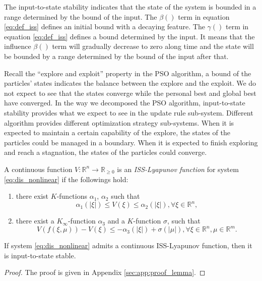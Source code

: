 The input-to-state stability indicates that the state of the system is bounded in a range determined by the bound of the input.
The $ \beta () $ term in equation \eqref{eq:def_iss} defines an initial bound with a decaying feature.
The $ \gamma () $ term in equation \eqref{eq:def_iss} defines a bound determined by the input.
It means that the influence $ \beta () $ term will gradually decrease to zero along time and the state will be bounded by a range determined by the bound of the input after that.

Recall the ``explore and exploit'' property in the PSO algorithm, a bound of the particles' states indicates the balance between the explore and the exploit.
We do not expect to see that the states converge while the personal best and global best have converged.
In the way we decomposed the PSO algorithm, input-to-state stability provides what we expect to see in the update rule sub-system.
Different algorithm provides different optimization strategy sub-systems. 
When it is expected to maintain a certain capability of the explore, the states of the particles could be managed in a boundary.
When it is expected to finish exploring and reach a stagnation, the states of the particles could converge.

\begin{mydef}\cite{Jiang2001857}
\label{eq:iss_func}
A continuous function $ V : \mathbb{R}^{n} \rightarrow \mathbb{R}_{\geq 0} $ is an \emph{ISS-Lyapunov function} for system \eqref{eq:dis_nonlinear} if the followings hold:
\begin{enumerate}
\item there exist $ K $-functions $ \alpha_{1} $, $ \alpha_{2} $ such that 
\begin{equation}
\label{eq:iss_lyapunov1}
\alpha_{1} ( | \xi | ) \leq V( \xi ) \leq \alpha_{2}  ( | \xi | ), \forall \xi \in \mathbb{R}^{n},
\end{equation}
\item there exist a $ K_{\infty} $-function $ \alpha_{3} $ and a $ K $-function $ \sigma $, such that
\begin{equation}
\label{eq:iss_lyapunov2}
V( f( \xi, \mu ) ) - V( \xi ) \leq - \alpha_{3} ( | \xi | ) + \sigma ( | \mu | ),
\forall \xi \in \mathbb{R}^{n}, \mu \in \mathbb{R}^{m}.
\end{equation}
\end{enumerate}
\end{mydef}

\begin{mylem}\cite{Jiang2001857}
\label{lem:iss_stable}
If system \eqref{eq:dis_nonlinear} admits a continuous ISS-Lyapunov function, then it is input-to-state stable.
\begin{proof}
The proof is given in Appendix \ref{sec:app:proof_lemma}.
\end{proof}
\end{mylem}


